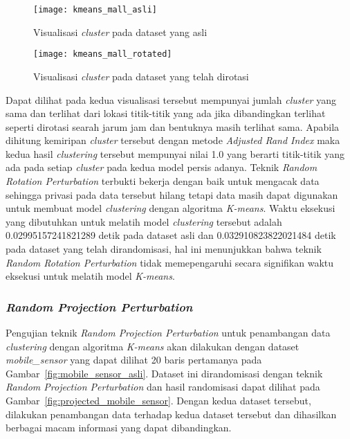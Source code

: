 \begin{figure}
	\centering
	\texttt{[image: kmeans\_mall\_asli]}
	\caption{Visualisasi \textit{cluster} pada dataset yang asli}
	\label{fig:kmeans_mall_asli}
\end{figure}

\begin{figure}
	\centering
	\texttt{[image: kmeans\_mall\_rotated]}
	\caption{Visualisasi \textit{cluster} pada dataset yang telah dirotasi}
	\label{fig:kmeans_mall_rotated}
\end{figure}

Dapat dilihat pada kedua visualisasi tersebut mempunyai jumlah \textit{cluster} yang sama dan terlihat dari lokasi titik-titik yang ada jika dibandingkan terlihat seperti dirotasi searah jarum jam dan bentuknya masih terlihat sama. Apabila dihitung kemiripan \textit{cluster} tersebut dengan metode \textit{Adjusted Rand Index} maka kedua hasil \textit{clustering} tersebut mempunyai nilai 1.0 yang berarti titik-titik yang ada pada setiap \textit{cluster} pada kedua model persis adanya. Teknik \textit{Random Rotation Perturbation} terbukti bekerja dengan baik untuk mengacak data sehingga privasi pada data tersebut hilang tetapi data masih dapat digunakan untuk membuat model \textit{clustering} dengan algoritma \textit{K-means}. Waktu eksekusi yang dibutuhkan untuk melatih model \textit{clustering} tersebut adalah 0.02995157241821289 detik pada dataset asli dan 0.032910823822021484 detik pada dataset yang telah dirandomisasi, hal ini menunjukkan bahwa teknik \textit{Random Rotation Perturbation} tidak memepengaruhi secara signifikan waktu eksekusi untuk melatih model \textit{K-means}.

\subsubsection{\textit{Random Projection Perturbation}}
\label{sec:pengujian-clustering-rpp}

Pengujian teknik \textit{Random Projection Perturbation} untuk penambangan data \textit{clustering} dengan algoritma \textit{K-means} akan dilakukan dengan dataset \textit{mobile\_sensor} yang dapat dilihat 20 baris pertamanya pada Gambar~\ref{fig:mobile_sensor_asli}. Dataset ini dirandomisasi dengan teknik \textit{Random Projection Perturbation} dan hasil randomisasi dapat dilihat pada Gambar~\ref{fig:projected_mobile_sensor}. Dengan kedua dataset tersebut, dilakukan penambangan data terhadap kedua dataset tersebut dan dihasilkan berbagai macam informasi yang dapat dibandingkan.

